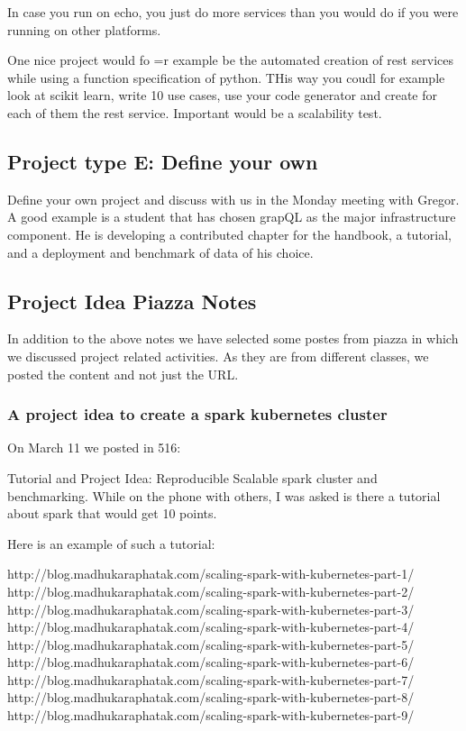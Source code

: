 In case you run on echo, you just do more services than you would do
if you were running on other platforms.

One nice project would fo =r example be the automated creation of rest
services while using a function specification of python. THis way you
coudl for example look at scikit learn, write 10 use cases, use your
code generator and create for each of them the rest service. Important
would be a scalability test.


\subsection{Project type E: Define your own}

Define your own project and discuss with us in the Monday meeting with
Gregor. 
A good example is a student that has chosen grapQL as the major
infrastructure component. He is developing a contributed chapter for
the handbook, a tutorial, and a deployment and benchmark of data of
his choice.


\subsection{Project Idea Piazza Notes}

In addition to the above notes we have selected some postes from
piazza in which we discussed project related activities. As they are
from different classes, we posted the content and not just the URL.


\subsubsection{A project idea to create a spark kubernetes cluster}

On March 11 we posted in 516:


Tutorial and Project Idea: Reproducible Scalable spark cluster and
benchmarking. While on the phone with others, I was asked is there a
tutorial about spark that would get 10 points.

Here is an example of such a tutorial:

http://blog.madhukaraphatak.com/scaling-spark-with-kubernetes-part-1/  
http://blog.madhukaraphatak.com/scaling-spark-with-kubernetes-part-2/ 
http://blog.madhukaraphatak.com/scaling-spark-with-kubernetes-part-3/ 
http://blog.madhukaraphatak.com/scaling-spark-with-kubernetes-part-4/ 
http://blog.madhukaraphatak.com/scaling-spark-with-kubernetes-part-5/ 
http://blog.madhukaraphatak.com/scaling-spark-with-kubernetes-part-6/ 
http://blog.madhukaraphatak.com/scaling-spark-with-kubernetes-part-7/ 
http://blog.madhukaraphatak.com/scaling-spark-with-kubernetes-part-8/ 
http://blog.madhukaraphatak.com/scaling-spark-with-kubernetes-part-9/ 

